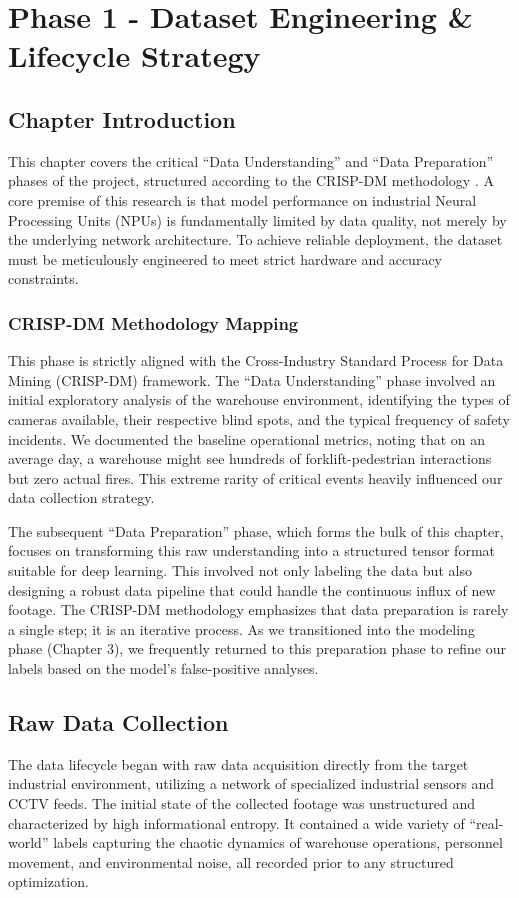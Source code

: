 \chapter{Phase 1 - Dataset Engineering \& Lifecycle Strategy}
\setcounter{section}{0}
\renewcommand{\thesection}{\arabic{section}}
\label{chap:phase1-data}

\section{Chapter Introduction}
This chapter covers the critical ``Data Understanding'' and ``Data Preparation'' phases of the project, structured according to the CRISP-DM methodology \cite{ref:crisp-dm}. A core premise of this research is that model performance on industrial Neural Processing Units (NPUs) is fundamentally limited by data quality, not merely by the underlying network architecture. To achieve reliable deployment, the dataset must be meticulously engineered to meet strict hardware and accuracy constraints.

\subsection{CRISP-DM Methodology Mapping}
This phase is strictly aligned with the Cross-Industry Standard Process for Data Mining (CRISP-DM) framework. The ``Data Understanding'' phase involved an initial exploratory analysis of the warehouse environment, identifying the types of cameras available, their respective blind spots, and the typical frequency of safety incidents. We documented the baseline operational metrics, noting that on an average day, a warehouse might see hundreds of forklift-pedestrian interactions but zero actual fires. This extreme rarity of critical events heavily influenced our data collection strategy.

The subsequent ``Data Preparation'' phase, which forms the bulk of this chapter, focuses on transforming this raw understanding into a structured tensor format suitable for deep learning. This involved not only labeling the data but also designing a robust data pipeline that could handle the continuous influx of new footage. The CRISP-DM methodology emphasizes that data preparation is rarely a single step; it is an iterative process. As we transitioned into the modeling phase (Chapter 3), we frequently returned to this preparation phase to refine our labels based on the model's false-positive analyses.

\section{Raw Data Collection}
The data lifecycle began with raw data acquisition directly from the target industrial environment, utilizing a network of specialized industrial sensors and CCTV feeds. The initial state of the collected footage was unstructured and characterized by high informational entropy. It contained a wide variety of ``real-world'' labels capturing the chaotic dynamics of warehouse operations, personnel movement, and environmental noise, all recorded prior to any structured optimization.

